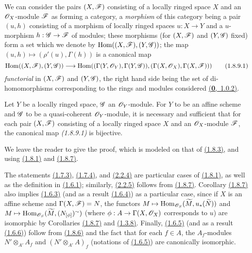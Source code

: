 \begin{env}[1.8.9]
\label{env-1.1.8.9}
We can consider the pairs $(X,\mathscr{F})$ consisting of a locally ringed space $X$ and an
$\mathscr{O}_X$-module $\mathscr{F}$ as forming a category, a {\it morphism} of this category being a
pair $(u,h)$ consisting of a morphism of locally ringed spaces
$u:X\to Y$ and a $u$-morphism $h:\mathscr{G}\to\mathscr{F}$ of modules; these morphisms (for
$(X,\mathscr{F})$ and $(Y,\mathscr{G})$ fixed) form a set which we denote by
${\mathop{\mathrm{Hom}}\nolimits}((X,\mathscr{F}),(Y,\mathscr{G}))$; the map $(u,h)\mapsto(\rho'(u),\Gamma(h))$ is a canonical
map
\[
  {\mathop{\mathrm{Hom}}\nolimits}((X,\mathscr{F}),(Y,\mathscr{G}))
  \longrightarrow{\mathop{\mathrm{Hom}}\nolimits}((\Gamma(Y,\mathscr{O}_Y),\Gamma(Y,\mathscr{G})),(\Gamma(X,\mathscr{O}_X),\Gamma(X,\mathscr{F})))
  \tag{1.8.9.1}
\]
{\it functorial} in $(X,\mathscr{F})$ and $(Y,\mathscr{G})$, the right hand side being the set of
di-homomorphisms corresponding to the rings and modules considered \hyperref[env-0.1.0.2]{(\textbf{0},~1.0.2)}.
\end{env}

\begin{cor}[1.8.10]
\label{cor-1.1.8.10}
Let $Y$ be a locally ringed space, $\mathscr{G}$ an $\mathscr{O}_Y$-module. For $Y$ to be an affine scheme
and $\mathscr{G}$ to be a quasi-coherent $\mathscr{O}_Y$-module, it is necessary and sufficient that for
each pair $(X,\mathscr{F})$ consisting of a locally ringed space $X$ and an $\mathscr{O}_X$-module
$\mathscr{F}$, the canonical map {\it (1.8.9.1)} is bijective.
\end{cor}

We leave the reader to give the proof, which is modeled on that of \hyperref[cor-1.1.8.3]{(1.8.3)}, and
using \hyperref[prop-1.1.8.1]{(1.8.1)} and \hyperref[cor-1.1.8.7]{(1.8.7)}.

\begin{rmk}[1.8.11]
\label{rmk-1.1.8.11}
The statements \hyperref[thm-1.1.7.3]{(1.7.3)}, \hyperref[cor-1.1.7.4]{(1.7.4)}, and \hyperref[prop-1.2.2.4]{(2.2.4)} are particular
cases of \hyperref[prop-1.1.8.1]{(1.8.1)}, as well as the definition in \hyperref[env-1.1.6.1]{(1.6.1)}; similarly,
\hyperref[prop-1.2.2.5]{(2.2.5)} follows from \hyperref[cor-1.1.8.7]{(1.8.7)}. Corollary \hyperref[cor-1.1.8.7]{(1.8.7)} also implies
\hyperref[prop-1.1.6.3]{(1.6.3)} (and as a result \hyperref[cor-1.1.6.4]{(1.6.4)}) as a particular case, since if $X$ is
an affine scheme and $\Gamma(X,\mathscr{F})=N$, the functors
$M\mapsto{\mathop{\mathrm{Hom}}\nolimits}_{\mathscr{O}_S}(\widetilde{M},u_*(\widetilde{N}))$ and
$M\mapsto{\mathop{\mathrm{Hom}}\nolimits}_{\mathscr{O}_S}(\widetilde{M},(N_{[\phi]})^\sim)$ (where $\phi:A\to\Gamma(X,\mathscr{O}_X)$
corresponds to $u$) are isomorphic by Corollaries \hyperref[cor-1.1.8.7]{(1.8.7)} and \hyperref[cor-1.1.3.8]{(1.3.8)}. Finally,
\hyperref[prop-1.1.6.5]{(1.6.5)} (and as a result \hyperref[cor-1.1.6.6]{(1.6.6)}) follow from \hyperref[cor-1.1.8.6]{(1.8.6)} and the
fact that for each $f\in A$, the $A_f$-modules $N'\otimes_{A'}A_f$ and $(N'\otimes_{A'}A)_f$
(notations of \hyperref[prop-1.1.6.5]{(1.6.5)}) are canonically isomorphic.
\end{rmk}

